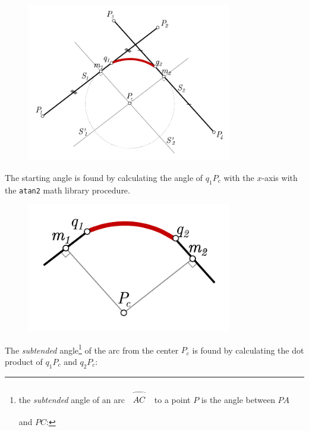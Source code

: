 \documentclass[12pt,openany,a4,usenames,dvipsnames]{book}
\DeclareRobustCommand\archat[1]{%
\begin{array}{c}
\stretchto{
  \scaleto{
    \scalerel*[\widthof{#1}]{\frown}
    {\rule[-\textheight/2]{1ex}{\textheight}} %
  }{1.25\textheight} %
}{0.5ex}\\           %
#1\\                   %
\rule{0ex}{.01ex}
\end{array}
}
\begin{document}
\begin{figure}[H]
  \centering{}
\includegraphics[width=0.8\textwidth,keepaspectratio]{figures/fillet_2.pdf}
\end{figure}

\noindent{}The starting angle is found by calculating the angle of $q_1P_c$ with the $x$-axis with the \texttt{atan2} math library procedure.

\begin{figure}[H]
  \centering{}
  \includegraphics[width=0.8\textwidth,keepaspectratio]{figures/fillet_3.pdf}
\end{figure}

\noindent{}The \emph{subtended} angle\footnote{the \emph{subtended} angle of an arc $\archat{AC}$ to a point $P$ is the angle between $PA$ and $PC$: } of the arc from the center $P_c$ is found by calculating the dot product of $q_1P_c$ and $q_2P_c$:
\end{document}

